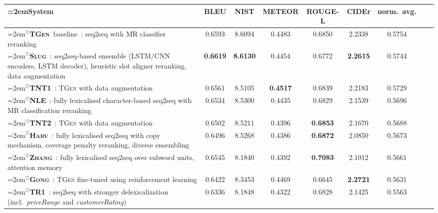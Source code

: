 \documentclass[11pt,a4paper]{article}
\newcommand\tgen{\textsc{TGen}\xspace}
\newcommand\slug{\textsc{Slug}\xspace}
\newcommand\tntnlgi{\textsc{TNT1}\xspace}
\newcommand\tntnlgii{\textsc{TNT2}\xspace}
\newcommand\gong{\textsc{Gong}\xspace}
\newcommand\harv{\textsc{Harv}\xspace}
\newcommand\nle{\textsc{NLE}\xspace}
\newcommand\thomsoni{\textsc{TR1}\xspace}
\newcommand\zhang{\textsc{Zhang}\xspace}
\newcommand{\symbseq}{$^\heartsuit$}
\newcommand\Ctgen{\textcolor{seqtoseq}{\symbseq\bf \tgen}}
\newcommand\Cslug{\textcolor{seqtoseq}{\symbseq\bf \slug}}
\newcommand\Ctntnlgi{\textcolor{seqtoseq}{\symbseq\bf \tntnlgi}}
\newcommand\Ctntnlgii{\textcolor{seqtoseq}{\symbseq\bf \tntnlgii}}
\newcommand\Cgong{\textcolor{seqtoseq}{\symbseq\bf \gong}}
\newcommand\Charv{\textcolor{seqtoseq}{\symbseq\bf \harv}}
\newcommand\Cnle{\textcolor{seqtoseq}{\symbseq\bf \nle}}
\newcommand\Cthomsoni{\textcolor{seqtoseq}{\symbseq\bf \thomsoni}}
\newcommand\Czhang{\textcolor{seqtoseq}{\symbseq\bf \zhang}}
\begin{document}
\begin{table*}[t]
\begin{center}
\scriptsize
\setlength{\extrarowheight}{3pt}
\begin{tabular}{>{\hspace{-1mm}\raggedright\hangindent=2em\arraybackslash}m{8.8cm}>{\hspace{-1mm}}cccccccc}
\textbf{System} & \bf BLEU & \bf NIST & \bf \hspace{-2mm}METEOR\hspace{-1mm} & \bf \hspace{-2mm}ROUGE-L\hspace{-3mm} & \bf CIDEr & \bf \hspace{-2mm}norm.~avg.\hspace{-2mm} \\ \hline\hline
\Ctgen\ baseline~\cite{novikova_e2e_2017}: seq2seq with MR classifier reranking & 0.6593  & 8.6094  & 0.4483  & 0.6850  & 2.2338 & 0.5754 \\\hdashline[0.5pt/2pt]
\Cslug~\cite{juraska_slug2slug:_2018}: seq2seq-based ensemble (LSTM/CNN encoders, LSTM decoder), heuristic slot aligner reranking, data augmentation & \bf 0.6619  & \bf 8.6130  & 0.4454  & 0.6772  & \bf 2.2615 & 0.5744 \\
\Ctntnlgi~\cite{oraby_tntnlg-personage_2018}: \tgen with data augmentation  & 0.6561  & 8.5105  & \bf 0.4517  & 0.6839  & 2.2183 & 0.5729 \\
\Cnle~\cite{agarwal_char-based_2018}: fully lexicalised character-based seq2seq with MR classification reranking & 0.6534  & 8.5300  & 0.4435  & 0.6829  & 2.1539 & 0.5696 \\
\Ctntnlgii~\cite{tandon_tntnlg-mr_shuffle_2018}: \tgen with data augmentation & 0.6502  & 8.5211  & 0.4396  & \bf 0.6853  & 2.1670 & 0.5688 \\
\Charv~\cite{gehrmann_end--end_2018}: fully lexicalised seq2seq with copy mechanism, coverage penalty reranking, diverse ensembling  & 0.6496  & 8.5268  & 0.4386  & \bf 0.6872  & 2.0850 & 0.5673 \\
\Czhang~\cite{zhang_attention_2018}: fully lexicalised seq2seq over subword units, attention memory & 0.6545  & 8.1840  & 0.4392  &\bf 0.7083  & 2.1012 & 0.5661 \\
\Cgong~\cite{gong_technical_2018}: \tgen fine-tuned using reinforcement learning  & 0.6422  & 8.3453  & 0.4469  & 0.6645  & \bf 2.2721 & 0.5631 \\
\Cthomsoni~\cite{schilder_e2e_2018}: seq2seq with stronger delexicalization (incl.\ \emph{priceRange} and \emph{customerRating})  & 0.6336  & 8.1848  & 0.4322  & 0.6828  & 2.1425 & 0.5563 \\

\end{tabular}
\end{center}
\end{table*}
\end{document}
